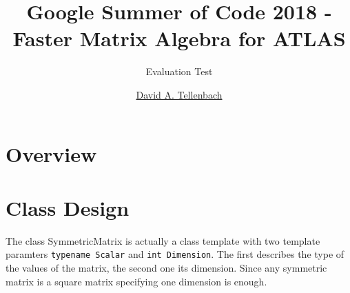 \documentclass[a4wide]{scrartcl}
\begin{document}
\title{Google Summer of Code 2018 - Faster Matrix Algebra for ATLAS}
\subtitle{Evaluation Test}
\author{\href{mailto: tellenbach@cip.ifi.lmu.de}{David A. Tellenbach}}
\maketitle
\section{Overview}
\section{Class Design}
The class SymmetricMatrix is actually a class template with two template paramters \texttt{typename Scalar} and \texttt{int Dimension}. The first describes the type of the values of the matrix, the second one its dimension. Since any symmetric matrix is a square matrix specifying one dimension is enough.
\end{document}
